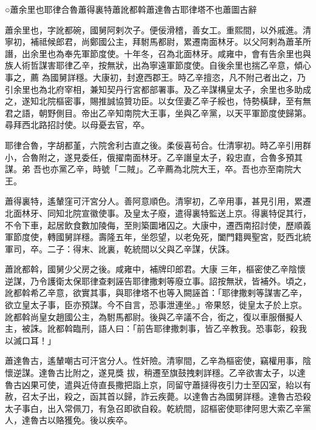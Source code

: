 
\begin{pinyinscope}

 ○蕭余里也耶律合魯蕭得裏特蕭訛都斡蕭達魯古耶律塔不也蕭圖古辭



 蕭余里也，字訛都碗，國舅阿剌次子。便佞滑稽，善女工。重熙間，以外戚進。清寧初，補祗候郎君，尚鄭國公主，拜駙馬都尉，累遷南面林牙。以父阿剌為蕭革所譖，出余里也為奉先軍節度使。十年冬，召為北面林牙。咸雍中，會有告余里也與族人術哲謀害耶律乙辛，按無狀，出為寧遠軍節度使。自後余里也揣乙辛意，傾心事之，薦
 為國舅詳穩。大康初，封遼西郡王。時乙辛擅恣，凡不附己者出之，乃引余里也為北府宰相，兼知契丹行宮都部署事。及乙辛謀構皇太子，余里也多助成之，遂知北院樞密事，賜推誠協贊功臣。以女侄妻乙辛子綏也，恃勢橫肆，至有無君之語，朝野側目。帝出乙辛知南院大王事，坐與乙辛黨，以天平軍節度使歸第。尋拜西北路招討使。以母憂去官，卒。



 耶律合魯，字胡都堇，六院舍利古直之後。柔佞喜茍合。仕清寧初。時乙辛引用群小，合魯附之，遂見委任，俄擢南面林牙。乙辛譖皇太子，殺忠直，合魯多預其謀。弟
 吾也亦黨乙辛，時號「二賊」。乙辛薦為北院大王，卒。吾也亦至南院大王。



 蕭得裏特，遙輦窪可汗宮分人。善阿意順色。清寧初，乙辛用事，甚見引用，累遷北面林牙、同知北院宣徽使事。及皇太子廢，遣得裏特監送上京。得裏特促其行，不令下車，起居飲食數加陵侮，至則築圜堵囚之。大康中，遷西南招討使，歷順義軍節度使，轉國舅詳穩。壽隆五年，坐怨望，以老免死，闔門籍興聖宮，貶西北統軍司，卒。二子：得末、訛裏，乾統間以父與乙辛謀，伏誅。



 蕭訛都斡，國舅少父房之後。咸雍中，補牌印郎君。大康
 三年，樞密使乙辛陰懷逆謀，乃令護衛太保耶律查剌誣告耶律撒剌等廢立事。詔按無狀，皆補外。頃之，訛都斡希乙辛意，欲實其事，與耶律塔不也等入闕誣首：「耶律撒剌等謀害乙辛，欲立皇太子事，臣亦預謀。今不自言，恐事泄連坐。」帝果怒，徙皇太子於上京。訛都斡尚皇女趙國公主，為駙馬都尉。後與乙辛議不合，銜之，復以車服僭擬人主，被誅。訛都斡臨刑，語人曰：「前告耶律撒刺事，皆乙辛教我。恐事彰，殺我以滅口耳！」



 蕭達魯古，遙輦嘲古可汗宮分人。性奸險。清寧間，乙辛為樞密使，竊權用事，陰懷逆謀。達魯古比附之，遂見獎
 拔，稍遷至旗鼓拽剌詳穩。乙辛欲害太子，以達魯古凶果可使，遣與近侍直長撒把詣上京，同留守蕭撻得夜引力士至囚室，紿以有赦，召太子出，殺之，函其首以歸，詐云疾薨。以達魯古為國舅詳穩。達魯古恐殺太子事白，出入常佩刀，有急召即欲自殺。乾統間，詔樞密使耶律阿思大索乙辛黨人，達魯古以賂獲免。後以疾卒。




\end{pinyinscope}
